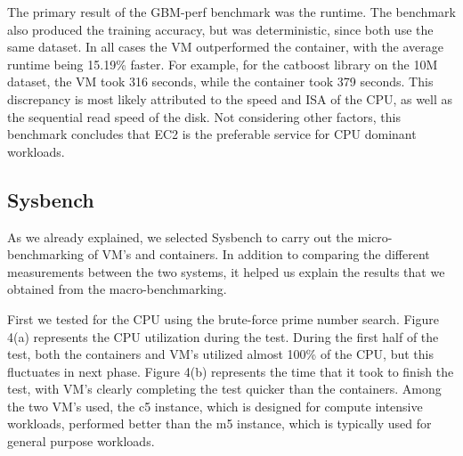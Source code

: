 \documentclass[11pt]{article}
\begin{document}
The primary result of the GBM-perf benchmark was the runtime. The benchmark also produced the training accuracy, but was deterministic, since both use the same dataset. In all cases the VM outperformed the container, with the average runtime being 15.19\% faster. For example, for the catboost library on the 10M dataset, the VM took 316 seconds, while the container took 379 seconds. This discrepancy is most likely attributed to the speed and ISA of the CPU, as well as the sequential read speed of the disk. Not considering other factors, this benchmark concludes that EC2 is the preferable service for CPU dominant workloads.


\subsection{Sysbench}

As we already explained, we selected Sysbench to carry out the micro-benchmarking of VM's and containers. In addition to comparing the different measurements between the two systems, it helped us explain the results that we obtained from the macro-benchmarking.

First we tested for the CPU using the brute-force prime number search. Figure 4(a) represents the CPU utilization during the test. During the first half of the test, both the containers and VM's utilized almost 100\% of the CPU, but this fluctuates in next phase. Figure 4(b) represents the time that it took to finish the test, with VM's clearly completing the test quicker than the containers. Among the two VM's used, the c5 instance, which is designed for compute intensive workloads, performed better than the m5 instance, which is typically used for general purpose workloads. 
\end{document}
